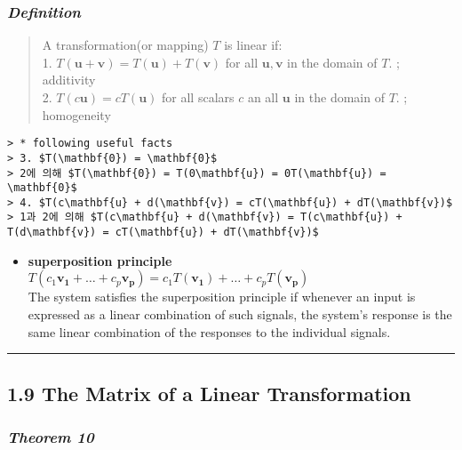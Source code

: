 \documentclass[11pt]{article}
\providecommand{\tightlist}{%
      \setlength{\itemsep}{0pt}\setlength{\parskip}{0pt}}
\begin{document}
\hypertarget{definition}{%
\subsubsection{\texorpdfstring{\emph{Definition}}{Definition}}\label{definition}}

\begin{quote}
A transformation(or mapping) \(T\) is linear if:\\
1. \(T(\mathbf{u + v}) = T(\mathbf{u}) + T(\mathbf{v})\) for all
\(\mathbf{u, v}\) in the domain of \(T\). ; additivity\\
2. \(T(c\mathbf{u}) = cT(\mathbf{u})\) for all scalars \(c\) an all
\(\mathbf{u}\) in the domain of \(T\). ; homogeneity
\end{quote}

\begin{verbatim}
> * following useful facts
> 3. $T(\mathbf{0}) = \mathbf{0}$  
> 2에 의해 $T(\mathbf{0}) = T(0\mathbf{u}) = 0T(\mathbf{u}) = \mathbf{0}$
> 4. $T(c\mathbf{u} + d(\mathbf{v}) = cT(\mathbf{u}) + dT(\mathbf{v})$  
> 1과 2에 의해 $T(c\mathbf{u} + d(\mathbf{v}) = T(c\mathbf{u}) + T(d\mathbf{v}) = cT(\mathbf{u}) + dT(\mathbf{v})$
\end{verbatim}

\begin{itemize}
\tightlist
\item
  \textbf{superposition principle}\\
  \(T(c_{1}\mathbf{v_{1}} + \dots + c_{p}\mathbf{v_{p}}) = c_{1}T(\mathbf{v_{1}}) + \dots + c_{p}T(\mathbf{v_{p}})\)\\
  The system satisfies the superposition principle if whenever an input
  is expressed as a linear combination of such signals, the system's
  response is the same linear combination of the responses to the
  individual signals.
\end{itemize}

    \begin{center}\rule{0.5\linewidth}{\linethickness}\end{center}

\hypertarget{the-matrix-of-a-linear-transformation}{%
\subsection{1.9 The Matrix of a Linear
Transformation}\label{the-matrix-of-a-linear-transformation}}

    \hypertarget{theorem-10}{%
\subsubsection{\texorpdfstring{\emph{Theorem
10}}{Theorem 10}}\label{theorem-10}}
\end{document}
